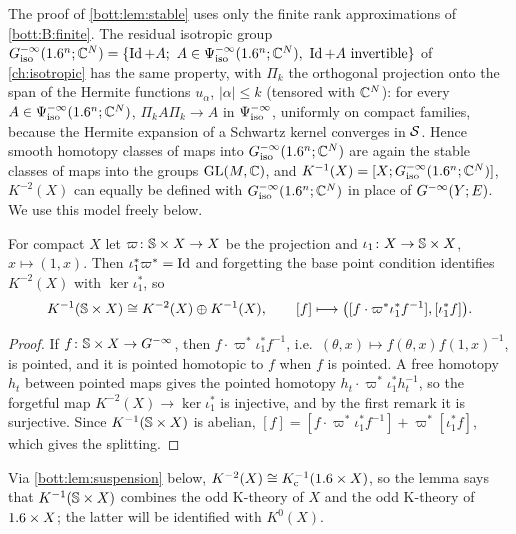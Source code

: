 \begin{remark}\label{bott:rem:iso-model}
  The proof of \cref{bott:lem:stable} uses only the finite rank approximations of
  \ref{bott:B:finite}. The residual isotropic group
  $\Gres(\R^n;\C^N)=\{\Id+A;\ A\in\Psiiso{-\infty}(\R^n;\C^N),\ \Id+A\text{ invertible}\}$
  of \cref{ch:isotropic} has the same property, with $\Pi_k$ the orthogonal projection
  onto the span of the Hermite functions $u_\alpha$, $|\alpha|\le k$ (tensored with
  $\mathbb{C}^N$): for every $A\in\Psi^{-\infty}_{\mathrm{iso}}(1.6^n;\mathbb{C}^N)$, $\Pi_kA\Pi_k\to A$ in
  $\Psi^{-\infty}_{\mathrm{iso}}$, uniformly on compact families, because the Hermite expansion of a
  Schwartz kernel converges in $\mathcal{S}$. Hence smooth homotopy classes of maps into
  $G^{-\infty}_{\mathrm{iso}}(1.6^n;\mathbb{C}^N)$ are again the stable classes of maps into the groups $\operatorname{GL}(M,\mathbb{C})$,
  and $K^{-1}(X)=[X;G^{-\infty}_{\mathrm{iso}}(1.6^n;\mathbb{C}^N)]$, $K^{-2}(X)$ can equally be defined with
  $G^{-\infty}_{\mathrm{iso}}(1.6^n;\mathbb{C}^N)$ in place of $G^{-\infty}(Y;E)$. We use this model freely below.
\end{remark}

\begin{lemma}\label{bott:lem:circle-split}
  For compact $X$ let $\varpi\colon\mathbb{S}\times X\to X$ be the projection and
  $\iota_1\colon X\to\mathbb{S}\times X$, $x\mapsto(1,x)$. Then $\iota_1^*\varpi^*=\operatorname{Id}$ and
  forgetting the base point condition identifies $K^{-2}(X)$ with $\ker\iota_1^*$, so
  \begin{equation*}
    K^{-1}(\mathbb{S}\times X)\cong K^{-2}(X)\oplus K^{-1}(X),\qquad
    [f]\longmapsto\bigl([f\cdot\varpi^*\iota_1^*f^{-1}],[\iota_1^*f]\bigr).
  \end{equation*}
\end{lemma}
\begin{proof}
  If $f\colon\mathbb{S}\times X\to G^{-\infty}$, then $f\cdot\varpi^*\iota_1^*f^{-1}$, i.e.\
  $(\theta,x)\mapsto f(\theta,x)f(1,x)^{-1}$, is pointed, and it is pointed homotopic
  to $f$ when $f$ is pointed. A free homotopy $h_t$ between pointed maps gives the
  pointed homotopy $h_t\cdot\varpi^*\iota_1^*h_t^{-1}$, so the forgetful map
  $K^{-2}(X)\to\ker\iota_1^*$ is injective, and by the first remark it is surjective.
  Since $K^{-1}(\mathbb{S}\times X)$ is abelian, $[f]=[f\cdot\varpi^*\iota_1^*f^{-1}]+
  \varpi^*[\iota_1^*f]$, which gives the splitting.
\end{proof}

Via \cref{bott:lem:suspension} below, $K^{-2}(X)\cong K_{\mathrm{c}}^{-1}(1.6\times X)$, so the lemma
says that $K^{-1}(\mathbb{S}\times X)$ combines the odd K-theory of $X$ and the odd
K-theory of $1.6\times X$; the latter will be identified with $K^0(X)$.

